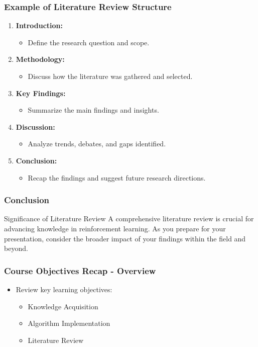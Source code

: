 \documentclass[aspectratio=169]{beamer}
\begin{document}
\begin{frame}[fragile]
    \frametitle{Example of Literature Review Structure}
    \begin{enumerate}
        \item \textbf{Introduction:}
            \begin{itemize}
                \item Define the research question and scope.
            \end{itemize}
        \item \textbf{Methodology:}
            \begin{itemize}
                \item Discuss how the literature was gathered and selected.
            \end{itemize}
        \item \textbf{Key Findings:}
            \begin{itemize}
                \item Summarize the main findings and insights.
            \end{itemize}
        \item \textbf{Discussion:}
            \begin{itemize}
                \item Analyze trends, debates, and gaps identified.
            \end{itemize}
        \item \textbf{Conclusion:}
            \begin{itemize}
                \item Recap the findings and suggest future research directions.
            \end{itemize}
    \end{enumerate}
\end{frame}

\begin{frame}[fragile]
    \frametitle{Conclusion}
    \begin{block}{Significance of Literature Review}
        A comprehensive literature review is crucial for advancing knowledge in reinforcement learning. As you prepare for your presentation, consider the broader impact of your findings within the field and beyond.
    \end{block}
\end{frame}

\begin{frame}[fragile]
    \frametitle{Course Objectives Recap - Overview}
    \begin{itemize}
        \item Review key learning objectives: 
            \begin{itemize}
                \item Knowledge Acquisition
                \item Algorithm Implementation
                \item Literature Review
            \end{itemize}
    \end{itemize}
\end{frame}
\end{document}
